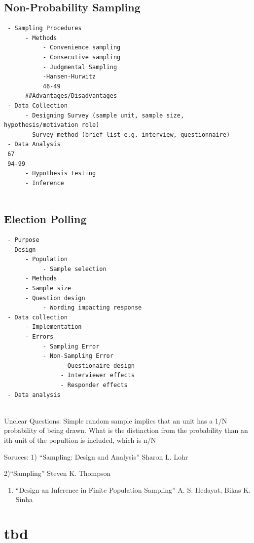 \documentclass[12pt,twoside]{reedthesis}
\providecommand{\tightlist}{%
  \setlength{\itemsep}{0pt}\setlength{\parskip}{0pt}}
\begin{document}
\hypertarget{non-probability-sampling}{%
\section{Non-Probability Sampling}\label{non-probability-sampling}}
\begin{verbatim}
 - Sampling Procedures
      - Methods
           - Convenience sampling
           - Consecutive sampling
           - Judgmental Sampling
           -Hansen-Hurwitz 
           46-49
      ##Advantages/Disadvantages
 - Data Collection
      - Designing Survey (sample unit, sample size, hypothesis/motivation role)
      - Survey method (brief list e.g. interview, questionnaire)
 - Data Analysis
 67
 94-99
      - Hypothesis testing
      - Inference
      
\end{verbatim}
\hypertarget{election-polling}{%
\section{Election Polling}\label{election-polling}}
\begin{verbatim}
 - Purpose
 - Design
      - Population
           - Sample selection
      - Methods
      - Sample size
      - Question design
           - Wording impacting response
 - Data collection
      - Implementation
      - Errors
           - Sampling Error
           - Non-Sampling Error
                - Questionaire design
                - Interviewer effects
                - Responder effects
 - Data analysis
 
\end{verbatim}
Unclear Questions:
Simple random sample implies that an unit has a 1/N probability of being drawn. What is the distinction from the probability than an ith unit of the popultion is included, which is n/N

Soruces:
1) ``Sampling: Design and Analysis'' Sharon L. Lohr

2)``Sampling'' Steven K. Thompson
\begin{enumerate}
\def\labelenumi{\arabic{enumi})}
\setcounter{enumi}{2}
\tightlist
\item
  ``Design an Inference in Finite Population Sampling'' A. S. Hedayat, Bikas K. Sinha
\end{enumerate}
\hypertarget{math-sci}{%
\chapter{tbd}\label{math-sci}}
\end{document}
